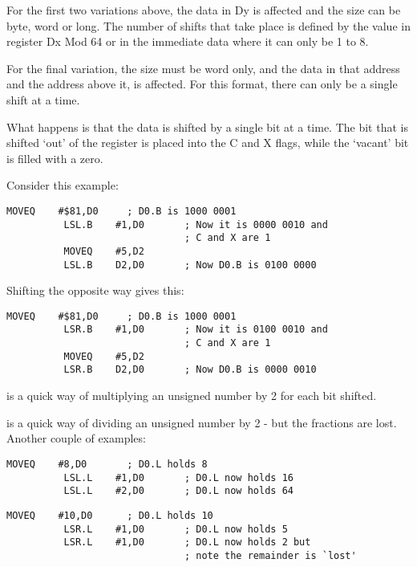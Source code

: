 For the first two variations above, the data in Dy is affected and
    the size can be byte, word or long. The number of shifts that take place
    is defined by the value in register Dx Mod 64 or in the immediate data 
    where it can only be 1 to 8.

For the final variation, the size must be word only, and the data in
    that address and the address above it, is affected. For this format, there
    can only be a single shift at a time.
    

What happens is that the data is shifted by a single bit at a time.
    The bit that is shifted `out' of the register is placed into the C and X
    flags, while the `vacant' bit is filled with a zero.

Consider this example:

\begin{lstlisting}[firstnumber=1,caption={LSL Example},label={lst:LslExample}]
          MOVEQ    #$81,D0     ; D0.B is 1000 0001
          LSL.B    #1,D0       ; Now it is 0000 0010 and 
                               ; C and X are 1
          MOVEQ    #5,D2
          LSL.B    D2,D0       ; Now D0.B is 0100 0000
\end{lstlisting}

Shifting the opposite way gives this:

\begin{lstlisting}[firstnumber=1,caption={LSR Example},label={lst:LsrExample}]
          MOVEQ    #$81,D0     ; D0.B is 1000 0001
          LSR.B    #1,D0       ; Now it is 0100 0010 and
                               ; C and X are 1
          MOVEQ    #5,D2
          LSR.B    D2,D0       ; Now D0.B is 0000 0010
\end{lstlisting}

 is a quick way of multiplying an unsigned number by 2 for each
    bit shifted.

 is a quick way of dividing an unsigned number by 2 -{} but the
    fractions are lost. Another couple of examples:

\begin{lstlisting}[firstnumber=1,caption={LSL Multlication Example},label={lst:LsMultiplicationlExample}]
          MOVEQ    #8,D0       ; D0.L holds 8
          LSL.L    #1,D0       ; D0.L now holds 16
          LSL.L    #2,D0       ; D0.L now holds 64
\end{lstlisting}

\begin{lstlisting}[firstnumber=1,caption={LSR Division Example},label={lst:LsrDivisionExample}]
          MOVEQ    #10,D0      ; D0.L holds 10
          LSR.L    #1,D0       ; D0.L now holds 5
          LSR.L    #1,D0       ; D0.L now holds 2 but
                               ; note the remainder is `lost'
\end{lstlisting}

